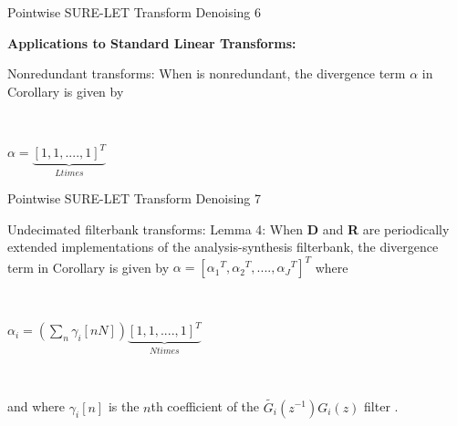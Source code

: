 \documentclass{beamer}
\begin{document}
	
	
	

		\begin{frame}{Pointwise SURE-LET Transform Denoising 6}

\textbf{Applications to Standard Linear Transforms:}
\begin{block}{Nonredundant transforms:}
When is nonredundant, the divergence term $\alpha$ in Corollary is given by

\

$\alpha= \underbrace{ \left[ 1,1,....,1\right]^T}_{L times}$
\end{block}




	
	
	\end{frame}
	

	
	
	
	
	\begin{frame}{Pointwise SURE-LET Transform Denoising 7}
	
	\begin{block}{Undecimated filterbank transforms:}
		Lemma 4: When \textbf{D} and \textbf{R} are periodically extended implementations of the analysis-synthesis filterbank, the divergence
		term in Corollary is given by $\alpha=[{\alpha_1}^T, {\alpha_2}^T,....,{\alpha_J}^T]^T $ where
		
		\
		
		\begin{center}
				$\alpha_i= \left(\displaystyle\sum_{n}\gamma_i[nN]\right)\underbrace{ \left[ 1,1,....,1\right]^T}_{N times}$
				
				\
				
				and where $\gamma_i[n]$ is the $n$th coefficient of the $\tilde{G_i}(z^{-1})G_i(z)$ filter .
			
		\end{center}
	
	\end{block}
	
\end{frame}
\end{document}
